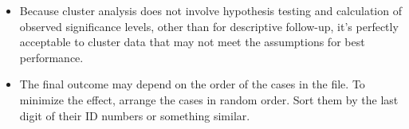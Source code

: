 \documentclass[a4paper,12pt]{article}
\begin{document}
\begin{itemize}
\item 
Because cluster analysis does not involve hypothesis testing and calculation of observed significance levels, other than for descriptive follow-up, it's perfectly acceptable to cluster data that may not meet the assumptions for best performance.
\item 
The final outcome may depend on the order of the cases in the file. To minimize the effect, arrange the cases in random order. Sort them by the last digit of their ID numbers or something similar.
\end{itemize}
\end{document}
